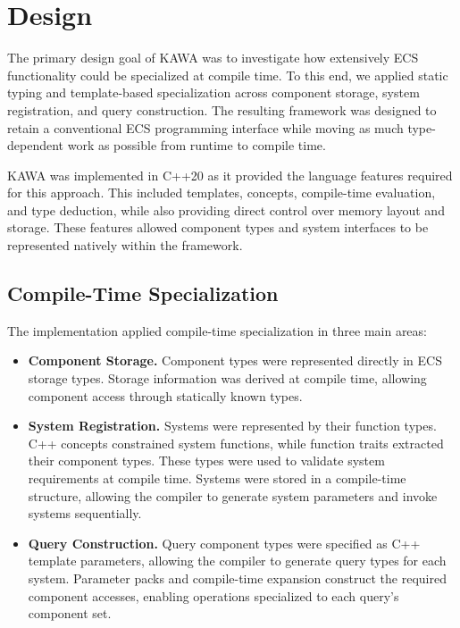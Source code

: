 \documentclass[conference]{IEEEtran}
\begin{document}
    \section{Design}
    \label{sec:design}

    The primary design goal of KAWA was to investigate how extensively ECS functionality could be specialized at compile time.
    To this end, we applied static typing and template-based specialization across component storage, system registration, and query construction.
    The resulting framework was designed to retain a conventional ECS programming interface while moving as much type-dependent work as possible from runtime to compile time.

    KAWA was implemented in C++20 as it provided the language features required for this approach.
    This included templates, concepts, compile-time evaluation, and type deduction, while also providing direct control over memory layout and storage.
    These features allowed component types and system interfaces to be represented natively within the framework.

    \subsection{Compile-Time Specialization}\label{subsec:compile-time-specialization}

    The implementation applied compile-time specialization in three main areas:

    \begin{itemize}
        \item \textbf{Component Storage.} Component types were represented directly in ECS storage types.
        Storage information was derived at compile time, allowing component access through statically known types.

        \item \textbf{System Registration.} Systems were represented by their function types.
        C++ concepts constrained system functions, while function traits extracted their component types.
        These types were used to validate system requirements at compile time.
        Systems were stored in a compile-time structure, allowing the compiler to generate system parameters and invoke systems sequentially.

        \item \textbf{Query Construction.} Query component types were specified as C++ template parameters, allowing the compiler to generate query types for each system.
        Parameter packs and compile-time expansion construct the required component accesses, enabling operations specialized to each query's component set.
    \end{itemize}
\end{document}
